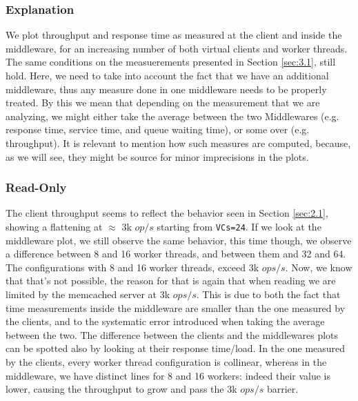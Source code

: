 \documentclass[11pt,a4paper]{article}
\begin{document}
\subsubsection{Explanation}

We plot throughput and response time as measured at the client and inside the middleware, for an increasing number of both virtual clients and  worker threads.\\
The same conditions on the measuerements presented in Section \ref{sec:3.1}, still hold. Here, we need to take into account the fact that we have an additional middleware, thus any measure done in one middleware needs to be properly treated. By this we mean that depending on the measurement that we are analyzing, we might either take the  average between the two Middlewares (e.g. response time, service time, and queue waiting time), or some over (e.g. throughput).
It is relevant to mention how such measures are computed, because, as we will see, they might be source for minor imprecisions in the plots.

\subsubsection*{Read-Only}

The client throughput seems to reflect the behavior seen in Section \ref{sec:2.1}, showing a flattening at $\approx$ 3k $op/s$ starting from \texttt{VCs=24}. If we look at the middleware plot, we still observe the same behavior, this time though, we observe a difference between 8 and 16 worker threads, and between them and 32 and 64. The configurations with 8 and 16 worker threads, exceed 3k $ops/s$. Now, we know that that's not possible, the reason for that is again that when reading we are limited by the memcached server at 3k $ops/s$. This is due to both the fact that time measurements inside the middleware are smaller than the one measured by the clients, and to the systematic error introduced when taking the average between the two.
The difference between the clients and the middlewares plots can be spotted also by looking at their response time/load. In the one measured by the clients, every worker thread configuration is collinear, whereas in the middleware, we have distinct lines for 8 and 16 workers: indeed their value is lower, causing the throughput to grow and pass the 3k $ops/s$ barrier.
\end{document}
